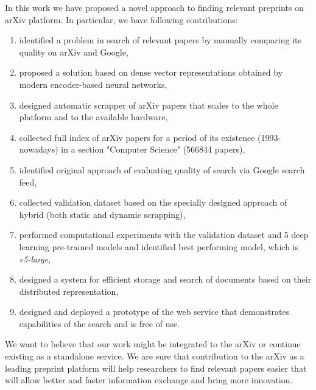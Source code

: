 \documentclass{article}
\begin{document}
    In this work we have proposed a novel approach to finding relevant preprints on arXiv platform. In particular, we have following contributions:
    
    \begin{enumerate}
        \item identified a problem in search of relevant papers by manually comparing its quality on arXiv and Google,
        \item proposed a solution based on dense vector representations obtained by modern encoder-based neural networks,
        \item designed automatic scrapper of arXiv papers that scales to the whole platform and to the available hardware,
        \item collected full index of arXiv papers for a period of its existence (1993-nowadays) in a section "Computer Science" (566844 papers),
        \item identified original approach of evaluating quality of search via Google search feed,
        \item collected validation dataset based on the specially designed approach of hybrid (both static and dynamic scrapping),
        \item performed computational experiments with the validation dataset and 5 deep learning pre-trained models and identified best performing model, which is \textit{e5-large},
        \item designed a system for efficient storage and search of documents based on their distributed representation,
        \item designed and deployed a prototype of the web service that demonstrates capabilities of the search and is free of use. 
    \end{enumerate}
    
    We want to believe that our work might be integrated to the arXiv or continue existing as a standalone service. We are sure that contribution to the arXiv as a leading preprint platform will help researchers to find relevant papers easier that will allow better and faster information exchange and bring more innovation. 



\end{document}
